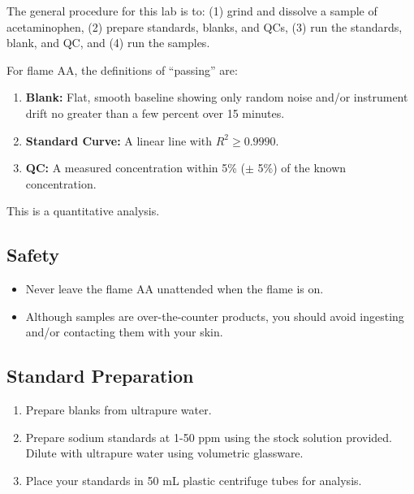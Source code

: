 \documentclass[]{tufte-book}
\providecommand{\tightlist}{%
  \setlength{\itemsep}{0pt}\setlength{\parskip}{0pt}}
\begin{document}
The general procedure for this lab is to: (1) grind and dissolve a sample of acetaminophen, (2) prepare standards, blanks, and QCs, (3) run the standards, blank, and QC, and (4) run the samples.

For flame AA, the definitions of ``passing'' are:

\begin{enumerate}
\def\labelenumi{\arabic{enumi}.}
\tightlist
\item
  \textbf{Blank:} Flat, smooth baseline showing only random noise and/or instrument drift no greater than a few percent over 15 minutes.\\
\item
  \textbf{Standard Curve:} A linear line with \(R^2 \ge 0.9990\).\\
\item
  \textbf{QC:} A measured concentration within 5\% (\(\pm\) 5\%) of the known concentration.
\end{enumerate}

This is a quantitative analysis.

\hypertarget{safety-3}{%
\subsection*{Safety}\label{safety-3}}

\begin{itemize}
\tightlist
\item
  Never leave the flame AA unattended when the flame is on.\\
\item
  Although samples are over-the-counter products, you should avoid ingesting and/or contacting them with your skin.
\end{itemize}

\hypertarget{standard-preparation-1}{%
\subsection{Standard Preparation}\label{standard-preparation-1}}

\begin{enumerate}
\def\labelenumi{\arabic{enumi}.}
\tightlist
\item
  Prepare blanks from ultrapure water.
\item
  Prepare sodium standards at 1-50 ppm using the stock solution provided. Dilute with ultrapure water using volumetric glassware.
\item
  Place your standards in 50 mL plastic centrifuge tubes for analysis.
\end{enumerate}
\end{document}
